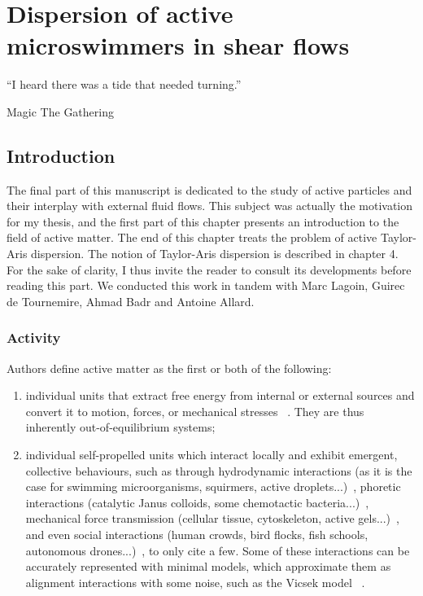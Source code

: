 \chapter{Dispersion of active microswimmers in shear flows}
\epigraph{``I heard there was a tide that needed turning.''}{Magic The Gathering}
\section{Introduction}
The final part of this manuscript is dedicated to the study of active particles and their interplay with external fluid flows. This subject was actually the motivation for my thesis, and the first part of this chapter presents an introduction to the field of active matter. The end of this chapter treats the problem of active Taylor-Aris dispersion. The notion of Taylor-Aris dispersion is described in chapter 4. For the sake of clarity, I thus invite the reader to consult its developments before reading this part. We conducted this work in tandem with Marc Lagoin, Guirec de Tournemire, Ahmad Badr and Antoine Allard. 
\subsection{Activity}

Authors define active matter as the first or both of the following:

\begin{enumerate}
    \item individual units that extract free energy from internal or external sources and convert it to motion, forces, or mechanical stresses ~\cite{prost_active_2009, ramaswamy_active_2010, marchetti_hydrodynamics_2013, bechinger_active_2016}. They are thus inherently out-of-equilibrium systems;
    \item individual self-propelled units which interact locally and exhibit emergent, collective behaviours, such as through hydrodynamic interactions (as it is the case for swimming microorganisms, squirmers, active droplets...)~\cite{marchetti_hydrodynamics_2013}, phoretic interactions (catalytic Janus colloids, some chemotactic bacteria...)~\cite{palacci_living_2013}, mechanical force transmission (cellular tissue, cytoskeleton, active gels...)~\cite{prost_active_2009}, and even social interactions (human crowds, bird flocks, fish schools, autonomous drones...)~\cite{toner_hydrodynamics_2005}, to only cite a few. Some of these interactions can be accurately represented with minimal models, which approximate them as alignment interactions with some noise, such as the Vicsek model ~\cite{vicsek_novel_1995}.
\end{enumerate}


